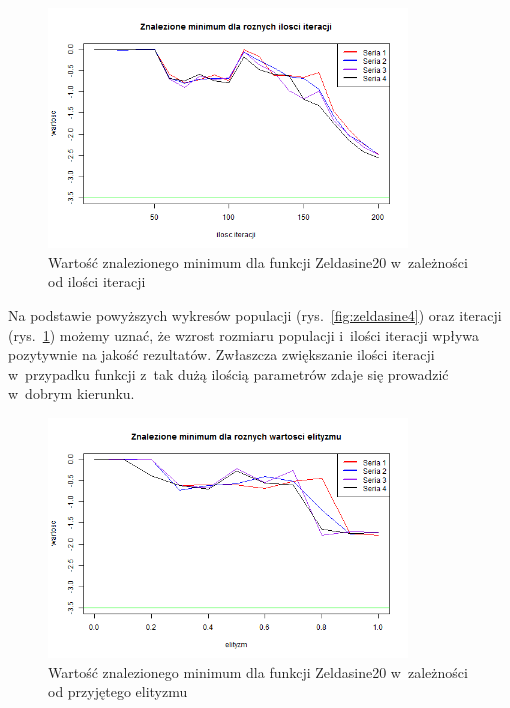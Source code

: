\documentclass[11pt, a4paper]{article}
\newcommand{\fbi}{\leavevmode{\parindent=1em\indent}}
\begin{document}
\begin{figure}[H]
	\begin{center}
		\includegraphics[width=0.85\textwidth]{./assets/Zeldasine205.png}
		\caption{Wartość znalezionego minimum dla funkcji Zeldasine20 w~zależności od ilości iteracji}
		\label{fig:zeldasine5}
	\end{center}
\end{figure}

\fbi
Na podstawie powyższych wykresów populacji (rys.~\ref{fig:zeldasine4}) oraz iteracji (rys.~\ref{fig:zeldasine5}) możemy uznać, że wzrost rozmiaru populacji i~ilości iteracji wpływa pozytywnie na jakość rezultatów. Zwłaszcza zwiększanie ilości iteracji w~przypadku funkcji z~tak dużą ilością parametrów zdaje się prowadzić w~dobrym kierunku.

\begin{figure}[H]
	\begin{center}
		\includegraphics[width=0.85\textwidth]{./assets/Zeldasine206.png}
		\caption{Wartość znalezionego minimum dla funkcji Zeldasine20 w~zależności od przyjętego elityzmu}
		\label{fig:zeldasine6}
	\end{center}
\end{figure}
\end{document}
